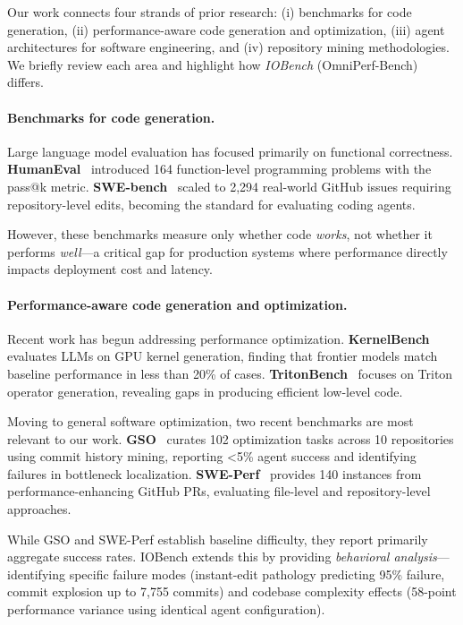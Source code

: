 \documentclass{article}
\theoremstyle{plain}
\theoremstyle{definition}
\theoremstyle{remark}
\begin{document}
Our work connects four strands of prior research: (i) benchmarks for code generation, (ii) performance-aware code generation and optimization, (iii) agent architectures for software engineering, and (iv) repository mining methodologies. We briefly review each area and highlight how \emph{IOBench} (OmniPerf-Bench) differs.

\paragraph{Benchmarks for code generation.}
Large language model evaluation has focused primarily on functional correctness.
\textbf{HumanEval}~\citep{chen2021evaluating} introduced 164 function-level programming problems with the pass@k metric.
\textbf{SWE-bench}~\citep{jimenez2023swe} scaled to 2,294 real-world GitHub issues requiring repository-level edits, becoming the standard for evaluating coding agents.

However, these benchmarks measure only whether code \emph{works}, not whether it performs \emph{well}---a critical gap for production systems where performance directly impacts deployment cost and latency.

\paragraph{Performance-aware code generation and optimization.}
Recent work has begun addressing performance optimization.
\textbf{KernelBench}~\citep{ouyang2025kernelbench} evaluates LLMs on GPU kernel generation, finding that frontier models match baseline performance in less than 20\% of cases.
\textbf{TritonBench}~\citep{li2025tritonbench} focuses on Triton operator generation, revealing gaps in producing efficient low-level code.

Moving to general software optimization, two recent benchmarks are most relevant to our work.
\textbf{GSO}~\citep{shetty2025gso} curates 102 optimization tasks across 10 repositories using commit history mining, reporting <5\% agent success and identifying failures in bottleneck localization.
\textbf{SWE-Perf}~\citep{he2025sweperf} provides 140 instances from performance-enhancing GitHub PRs, evaluating file-level and repository-level approaches.

While GSO and SWE-Perf establish baseline difficulty, they report primarily aggregate success rates. IOBench extends this by providing \emph{behavioral analysis}---identifying specific failure modes (instant-edit pathology predicting 95\% failure, commit explosion up to 7,755 commits) and codebase complexity effects (58-point performance variance using identical agent configuration).
\end{document}
